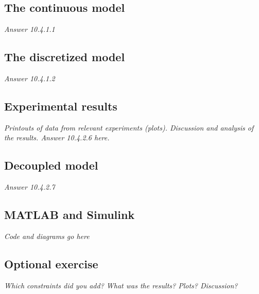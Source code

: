 \documentclass[../main.tex]{subfiles}
\begin{document}
\subsection{The continuous model}
\textit{Answer 10.4.1.1}

\subsection{The discretized model}
\textit{Answer 10.4.1.2}

\subsection{Experimental results}
\textit{Printouts of data from relevant experiments (plots).
Discussion and analysis of the results.
Answer 10.4.2.6 here.}

\subsection{Decoupled model}
\textit{Answer 10.4.2.7}

\subsection{MATLAB and Simulink}
\textit{Code and diagrams go here}

\subsection{Optional exercise}
\textit{Which constraints did you add? What was the results? Plots? Discussion?}
\end{document}
